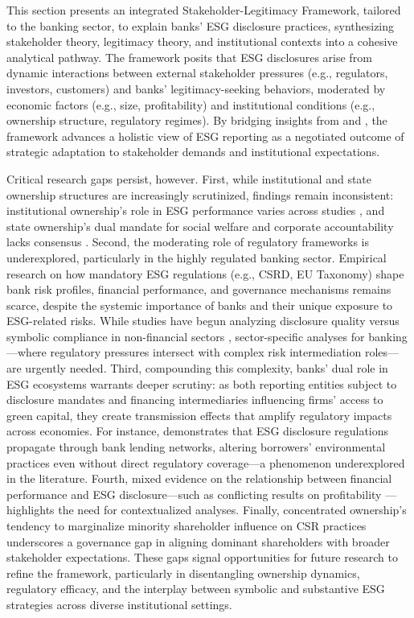 \documentclass[
  authoryear]{elsarticle}
\begin{document}
This section presents an integrated Stakeholder-Legitimacy Framework,
tailored to the banking sector, to explain banks' ESG disclosure
practices, synthesizing stakeholder theory, legitimacy theory, and
institutional contexts into a cohesive analytical pathway. The framework
posits that ESG disclosures arise from dynamic interactions between
external stakeholder pressures (e.g., regulators, investors, customers)
and banks' legitimacy-seeking behaviors, moderated by economic factors
(e.g., size, profitability) and institutional conditions (e.g.,
ownership structure, regulatory regimes). By bridging insights from
\citet{CAMPBELL2007} and \citet{AGUINIS2012}, the framework advances a
holistic view of ESG reporting as a negotiated outcome of strategic
adaptation to stakeholder demands and institutional expectations.

Critical research gaps persist, however. First, while institutional and
state ownership structures are increasingly scrutinized, findings remain
inconsistent: institutional ownership's role in ESG performance varies
across studies \citep[e.g.,][]{DYCK2019, ALUCHNA2022}, and state
ownership's dual mandate for social welfare and corporate accountability
lacks consensus \citep{TAGESSON2009, RAIMO2020}. Second, the moderating
role of regulatory frameworks is underexplored, particularly in the
highly regulated banking sector. Empirical research on how mandatory ESG
regulations (e.g., CSRD, EU Taxonomy) shape bank risk profiles,
financial performance, and governance mechanisms remains scarce, despite
the systemic importance of banks and their unique exposure to
ESG-related risks. While studies have begun analyzing disclosure quality
versus symbolic compliance in non-financial sectors
\citep{CICCHIELLO2023, MANOS2024}, sector-specific analyses for
banking---where regulatory pressures intersect with complex risk
intermediation roles---are urgently needed. Third, compounding this
complexity, banks' dual role in ESG ecosystems warrants deeper scrutiny:
as both reporting entities subject to disclosure mandates and financing
intermediaries influencing firms' access to green capital, they create
transmission effects that amplify regulatory impacts across economies.
For instance, \citet{WANG2023} demonstrates that ESG disclosure
regulations propagate through bank lending networks, altering borrowers'
environmental practices even without direct regulatory coverage---a
phenomenon underexplored in the literature. Fourth, mixed evidence on
the relationship between financial performance and ESG disclosure---such
as conflicting results on profitability
\citep{HADDOCK2005, DYDUCH2017}---highlights the need for contextualized
analyses. Finally, concentrated ownership's tendency to marginalize
minority shareholder influence on CSR practices
\citep{SMITH2022, BORGES2024} underscores a governance gap in aligning
dominant shareholders with broader stakeholder expectations. These gaps
signal opportunities for future research to refine the framework,
particularly in disentangling ownership dynamics, regulatory efficacy,
and the interplay between symbolic and substantive ESG strategies across
diverse institutional settings.
\end{document}
